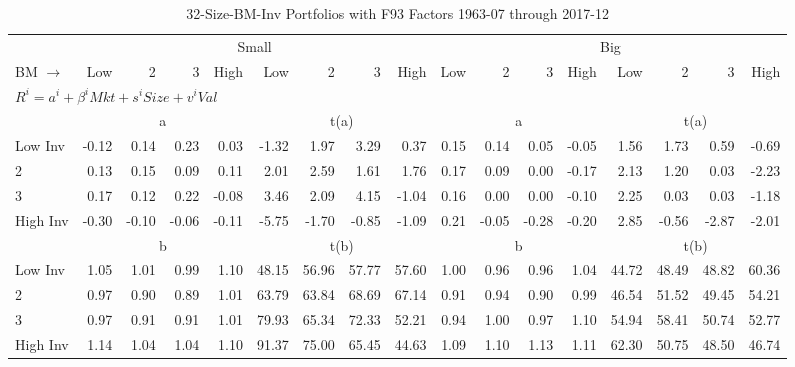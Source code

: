 
\begin{table}[!ht]
\footnotesize
\centering
\caption{32-Size-BM-Inv Portfolios with F93 Factors 1963-07 through 2017-12}
\begin{tabular}{lrrrrrrrrrrrrrrrr}
  \toprule
    & \multicolumn{8}{c}{Small} & \multicolumn{8}{c}{Big} \\
      \cmidrule(r){2-9} \cmidrule(r){10-17}
    BM $\rightarrow$ & Low & 2 & 3 & High & Low & 2 & 3 & High & Low & 2 & 3 & High & Low & 2 & 3 & High \\ 
  \midrule
  \multicolumn{17}{l}{$R^i=a^i+\beta^iMkt+s^iSize+v^iVal$} \\

  
    
      & \multicolumn{4}{c}{a} & \multicolumn{4}{c}{t(a)}
    
      & \multicolumn{4}{c}{a} & \multicolumn{4}{c}{t(a)}
    
    \\
      \cmidrule(r){2-5} \cmidrule(r){6-9} \cmidrule(r){10-13} \cmidrule(r){14-17}

    Low Inv   & -0.12  & 0.14  & 0.23  & 0.03  & -1.32  & 1.97  & 3.29  & 0.37  & 0.15  & 0.14  & 0.05  & -0.05  & 1.56  & 1.73  & 0.59  & -0.69  \\
           2  & 0.13  & 0.15  & 0.09  & 0.11  & 2.01  & 2.59  & 1.61  & 1.76  & 0.17  & 0.09  & 0.00  & -0.17  & 2.13  & 1.20  & 0.03  & -2.23  \\
           3  & 0.17  & 0.12  & 0.22  & -0.08  & 3.46  & 2.09  & 4.15  & -1.04  & 0.16  & 0.00  & 0.00  & -0.10  & 2.25  & 0.03  & 0.03  & -1.18  \\
    High Inv  & -0.30  & -0.10  & -0.06  & -0.11  & -5.75  & -1.70  & -0.85  & -1.09  & 0.21  & -0.05  & -0.28  & -0.20  & 2.85  & -0.56  & -2.87  & -2.01  \\

  
    
      & \multicolumn{4}{c}{b} & \multicolumn{4}{c}{t(b)}
    
      & \multicolumn{4}{c}{b} & \multicolumn{4}{c}{t(b)}
    
    \\
      \cmidrule(r){2-5} \cmidrule(r){6-9} \cmidrule(r){10-13} \cmidrule(r){14-17}

    Low Inv   & 1.05  & 1.01  & 0.99  & 1.10  & 48.15  & 56.96  & 57.77  & 57.60  & 1.00  & 0.96  & 0.96  & 1.04  & 44.72  & 48.49  & 48.82  & 60.36  \\
           2  & 0.97  & 0.90  & 0.89  & 1.01  & 63.79  & 63.84  & 68.69  & 67.14  & 0.91  & 0.94  & 0.90  & 0.99  & 46.54  & 51.52  & 49.45  & 54.21  \\
           3  & 0.97  & 0.91  & 0.91  & 1.01  & 79.93  & 65.34  & 72.33  & 52.21  & 0.94  & 1.00  & 0.97  & 1.10  & 54.94  & 58.41  & 50.74  & 52.77  \\
    High Inv  & 1.14  & 1.04  & 1.04  & 1.10  & 91.37  & 75.00  & 65.45  & 44.63  & 1.09  & 1.10  & 1.13  & 1.11  & 62.30  & 50.75  & 48.50  & 46.74  \\


\end{tabular}
\end{table}
